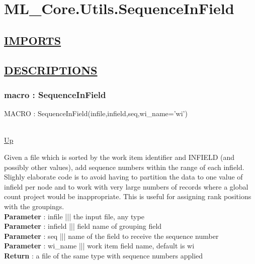 \chapter*{ML\_Core.Utils.SequenceInField}
\hypertarget{ML_Core.Utils.SequenceInField}{}

\section*{\underline{IMPORTS}}

\section*{\underline{DESCRIPTIONS}}
\subsection*{macro : SequenceInField}
\hypertarget{ecldoc:ml_core.utils.sequenceinfield}{MACRO : SequenceInField(infile,infield,seq,wi\_name='wi')} \\
\hyperlink{ecldoc:}{Up} \\
\par
Given a file which is sorted by the work item identifier and INFIELD (and possibly other values), add sequence numbers within the range of each infield. Slighly elaborate code is to avoid having to partition the data to one value of infield per node and to work with very large numbers of records where a global count project would be inappropriate. This is useful for assigning rank positions with the groupings. \\
\textbf{Parameter} : infile ||| the input file, any type \\
\textbf{Parameter} : infield ||| field name of grouping field \\
\textbf{Parameter} : seq ||| name of the field to receive the sequence number \\
\textbf{Parameter} : wi\_name ||| work item field name, default is wi \\
\textbf{Return} : a file of the same type with sequence numbers applied \\
